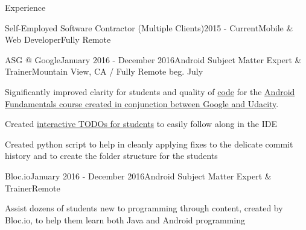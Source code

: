 \documentclass{resume} %
\begin{document}
\begin{rSection}{Experience}
\begin{rSubsection}{Self-Employed Software Contractor (Multiple Clients)}{2015 - Current}{Mobile \& Web Developer}{Fully Remote}
% 
\begin{rSubsection}{ASG @ Google}{January 2016 - December 2016}{Android Subject Matter Expert \& Trainer}{Mountain View, CA / Fully Remote beg. July}
\item Significantly improved clarity for students and quality of 
\href{https://github.com/udacity/ud851-Sunshine}{code} 
for the 
\href{https://www.udacity.com/course/new-android-fundamentals--ud851}{Android Fundamentals course created in conjunction between Google and Udacity}.
\item Created
\href{https://github.com/udacity/ud851-Sunshine/blob/student/S01.01-Exercise-CreateLayout/app/src/main/res/layout/activity_forecast.xml#L17-L18}{interactive TODOs for students} to easily follow along in the IDE
\item Created python script to help in cleanly applying fixes to the delicate commit history and to create the folder structure for the students 
\end{rSubsection}


\begin{rSubsection}{Bloc.io}{January 2016 - December 2016}{Android Subject Matter Expert \& Trainer}{Remote}
\item Assist dozens of students new to programming through content, created by Bloc.io, to help them learn both Java and Android programming
\end{rSubsection}



\end{rSubsection}
\end{rSection}
\end{document}
